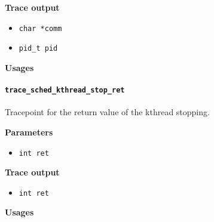\textbf{Trace output}
\begin{itemize}
    \item \verb|char *comm|
    \item \verb|pid_t pid|
\end{itemize}

\textbf{Usages}
\begin{code}

\end{code}

\paragraph{\texttt{trace\_sched\_kthread\_stop\_ret}}
Tracepoint for the return value of the kthread stopping.

\textbf{Parameters}
\begin{itemize}
    \item \verb|int ret|
\end{itemize}

\textbf{Trace output}
\begin{itemize}
    \item \verb|int ret|
\end{itemize}

\textbf{Usages}
\begin{code}

\end{code}